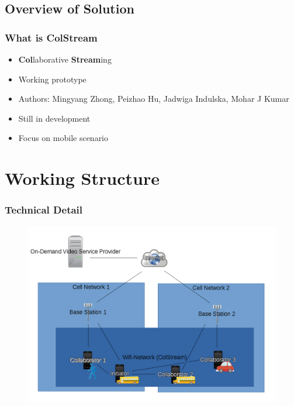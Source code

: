 \documentclass{beamer} %
\begin{document}
\subsection{Overview of Solution}
\begin{frame}
\frametitle{What is ColStream}
\begin{itemize}
\item {\bf Col}laborative {\bf Stream}ing
\item Working prototype
\item Authors: Mingyang Zhong, Peizhao Hu, Jadwiga Indulska, Mohar J Kumar
\item Still in development
\item Focus on mobile scenario
\end{itemize}
\end{frame}

\section{Working Structure}
\begin{frame}
\frametitle{Technical Detail}
\begin{figure}[hbtp]
\centering
\includegraphics[scale=.35]{figures/Overview.png}
\end{figure}


\end{frame}
\end{document}
